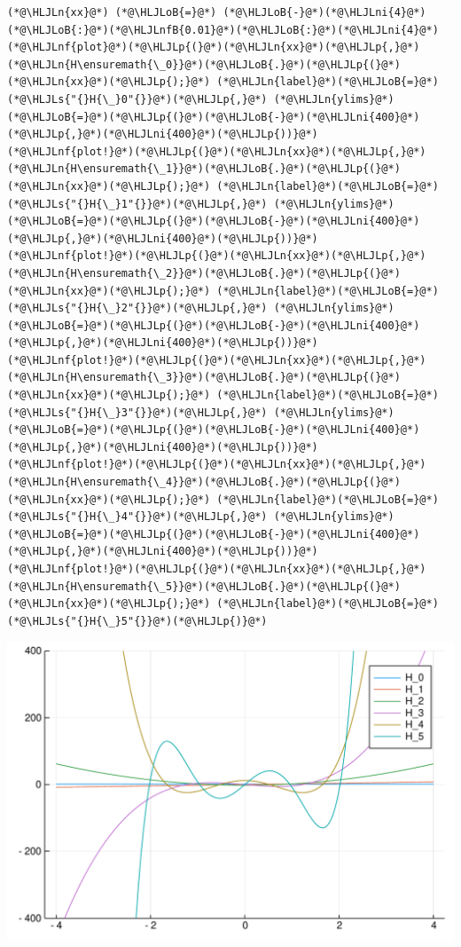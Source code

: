 \documentclass[12pt,a4paper]{article}
\newcommand{\HLJLn}[1]{#1}
\newcommand{\HLJLnf}[1]{\textcolor[RGB]{66,102,213}{#1}}
\newcommand{\HLJLs}[1]{\textcolor[RGB]{201,61,57}{#1}}
\newcommand{\HLJLnfB}[1]{\textcolor[RGB]{59,151,46}{#1}}
\newcommand{\HLJLni}[1]{\textcolor[RGB]{59,151,46}{#1}}
\newcommand{\HLJLoB}[1]{\textcolor[RGB]{102,102,102}{\textbf{#1}}}
\newcommand{\HLJLp}[1]{#1}
\begin{document}
\begin{lstlisting}
(*@\HLJLn{xx}@*) (*@\HLJLoB{=}@*) (*@\HLJLoB{-}@*)(*@\HLJLni{4}@*)(*@\HLJLoB{:}@*)(*@\HLJLnfB{0.01}@*)(*@\HLJLoB{:}@*)(*@\HLJLni{4}@*)
(*@\HLJLnf{plot}@*)(*@\HLJLp{(}@*)(*@\HLJLn{xx}@*)(*@\HLJLp{,}@*) (*@\HLJLn{H\ensuremath{\_0}}@*)(*@\HLJLoB{.}@*)(*@\HLJLp{(}@*)(*@\HLJLn{xx}@*)(*@\HLJLp{);}@*) (*@\HLJLn{label}@*)(*@\HLJLoB{=}@*)(*@\HLJLs{"{}H{\_}0"{}}@*)(*@\HLJLp{,}@*) (*@\HLJLn{ylims}@*)(*@\HLJLoB{=}@*)(*@\HLJLp{(}@*)(*@\HLJLoB{-}@*)(*@\HLJLni{400}@*)(*@\HLJLp{,}@*)(*@\HLJLni{400}@*)(*@\HLJLp{))}@*)
(*@\HLJLnf{plot!}@*)(*@\HLJLp{(}@*)(*@\HLJLn{xx}@*)(*@\HLJLp{,}@*) (*@\HLJLn{H\ensuremath{\_1}}@*)(*@\HLJLoB{.}@*)(*@\HLJLp{(}@*)(*@\HLJLn{xx}@*)(*@\HLJLp{);}@*) (*@\HLJLn{label}@*)(*@\HLJLoB{=}@*)(*@\HLJLs{"{}H{\_}1"{}}@*)(*@\HLJLp{,}@*) (*@\HLJLn{ylims}@*)(*@\HLJLoB{=}@*)(*@\HLJLp{(}@*)(*@\HLJLoB{-}@*)(*@\HLJLni{400}@*)(*@\HLJLp{,}@*)(*@\HLJLni{400}@*)(*@\HLJLp{))}@*)
(*@\HLJLnf{plot!}@*)(*@\HLJLp{(}@*)(*@\HLJLn{xx}@*)(*@\HLJLp{,}@*) (*@\HLJLn{H\ensuremath{\_2}}@*)(*@\HLJLoB{.}@*)(*@\HLJLp{(}@*)(*@\HLJLn{xx}@*)(*@\HLJLp{);}@*) (*@\HLJLn{label}@*)(*@\HLJLoB{=}@*)(*@\HLJLs{"{}H{\_}2"{}}@*)(*@\HLJLp{,}@*) (*@\HLJLn{ylims}@*)(*@\HLJLoB{=}@*)(*@\HLJLp{(}@*)(*@\HLJLoB{-}@*)(*@\HLJLni{400}@*)(*@\HLJLp{,}@*)(*@\HLJLni{400}@*)(*@\HLJLp{))}@*)
(*@\HLJLnf{plot!}@*)(*@\HLJLp{(}@*)(*@\HLJLn{xx}@*)(*@\HLJLp{,}@*) (*@\HLJLn{H\ensuremath{\_3}}@*)(*@\HLJLoB{.}@*)(*@\HLJLp{(}@*)(*@\HLJLn{xx}@*)(*@\HLJLp{);}@*) (*@\HLJLn{label}@*)(*@\HLJLoB{=}@*)(*@\HLJLs{"{}H{\_}3"{}}@*)(*@\HLJLp{,}@*) (*@\HLJLn{ylims}@*)(*@\HLJLoB{=}@*)(*@\HLJLp{(}@*)(*@\HLJLoB{-}@*)(*@\HLJLni{400}@*)(*@\HLJLp{,}@*)(*@\HLJLni{400}@*)(*@\HLJLp{))}@*)
(*@\HLJLnf{plot!}@*)(*@\HLJLp{(}@*)(*@\HLJLn{xx}@*)(*@\HLJLp{,}@*) (*@\HLJLn{H\ensuremath{\_4}}@*)(*@\HLJLoB{.}@*)(*@\HLJLp{(}@*)(*@\HLJLn{xx}@*)(*@\HLJLp{);}@*) (*@\HLJLn{label}@*)(*@\HLJLoB{=}@*)(*@\HLJLs{"{}H{\_}4"{}}@*)(*@\HLJLp{,}@*) (*@\HLJLn{ylims}@*)(*@\HLJLoB{=}@*)(*@\HLJLp{(}@*)(*@\HLJLoB{-}@*)(*@\HLJLni{400}@*)(*@\HLJLp{,}@*)(*@\HLJLni{400}@*)(*@\HLJLp{))}@*)
(*@\HLJLnf{plot!}@*)(*@\HLJLp{(}@*)(*@\HLJLn{xx}@*)(*@\HLJLp{,}@*) (*@\HLJLn{H\ensuremath{\_5}}@*)(*@\HLJLoB{.}@*)(*@\HLJLp{(}@*)(*@\HLJLn{xx}@*)(*@\HLJLp{);}@*) (*@\HLJLn{label}@*)(*@\HLJLoB{=}@*)(*@\HLJLs{"{}H{\_}5"{}}@*)(*@\HLJLp{)}@*)
\end{lstlisting}

\includegraphics[width=\linewidth]{figures/Lecture21_1_1.pdf}
\end{document}
